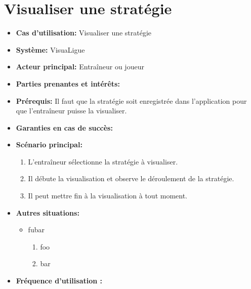 \section{Visualiser une stratégie}
\label{sec:visualiser_une_strategie}
\begin{itemize}
    \item \textbf{Cas d'utilisation:} Visualiser une strat\'egie
    \item \textbf{Syst\`eme:} VisuaLigue
    \item \textbf{Acteur principal:} Entra\^ineur ou joueur
    \item \textbf{Parties prenantes et int\'er\^ets:}
    \item \textbf{Pr\'erequis:} Il faut que la strat\'egie soit enregistr\'ee dans l'application pour que l'entraîneur puisse la visualiser.
    \item \textbf{Garanties en cas de succ\`es:}
    \item \textbf{Sc\'enario principal:}
        \begin{enumerate}
            \item L'entra\^ineur s\'electionne la strat\'egie \`a visualiser.
            \item Il d\'ebute la visualisation et observe le d\'eroulement de la strat\'egie.
            \item Il peut mettre fin \`a la visualisation \`a tout moment.
        \end{enumerate}
    \item \textbf{Autres situations:}
        \begin{itemize}
            \item fubar
                \begin{enumerate}
                    \item foo
                    \item bar
                \end{enumerate}
        \end{itemize}
    \item \textbf{Fréquence d'utilisation :}
\end{itemize}
